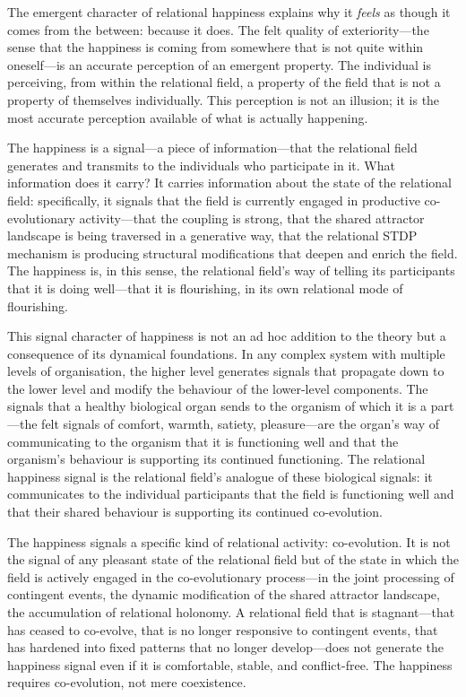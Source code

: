 The emergent character of relational happiness explains why it \emph{feels} as though it comes from the between: because it does. The felt quality of exteriority---the sense that the happiness is coming from somewhere that is not quite within oneself---is an accurate perception of an emergent property. The individual is perceiving, from within the relational field, a property of the field that is not a property of themselves individually. This perception is not an illusion; it is the most accurate perception available of what is actually happening.

 The happiness is a signal---a piece of information---that the relational field generates and transmits to the individuals who participate in it. What information does it carry? It carries information about the state of the relational field: specifically, it signals that the field is currently engaged in productive co-evolutionary activity---that the coupling is strong, that the shared attractor landscape is being traversed in a generative way, that the relational STDP mechanism is producing structural modifications that deepen and enrich the field. The happiness is, in this sense, the relational field's way of telling its participants that it is doing well---that it is flourishing, in its own relational mode of flourishing.

This signal character of happiness is not an ad hoc addition to the theory but a consequence of its dynamical foundations. In any complex system with multiple levels of organisation, the higher level generates signals that propagate down to the lower level and modify the behaviour of the lower-level components. The signals that a healthy biological organ sends to the organism of which it is a part---the felt signals of comfort, warmth, satiety, pleasure---are the organ's way of communicating to the organism that it is functioning well and that the organism's behaviour is supporting its continued functioning. The relational happiness signal is the relational field's analogue of these biological signals: it communicates to the individual participants that the field is functioning well and that their shared behaviour is supporting its continued co-evolution.

 The happiness signals a specific kind of relational activity: co-evolution. It is not the signal of any pleasant state of the relational field but of the state in which the field is actively engaged in the co-evolutionary process---in the joint processing of contingent events, the dynamic modification of the shared attractor landscape, the accumulation of relational holonomy. A relational field that is stagnant---that has ceased to co-evolve, that is no longer responsive to contingent events, that has hardened into fixed patterns that no longer develop---does not generate the happiness signal even if it is comfortable, stable, and conflict-free. The happiness requires co-evolution, not mere coexistence.

